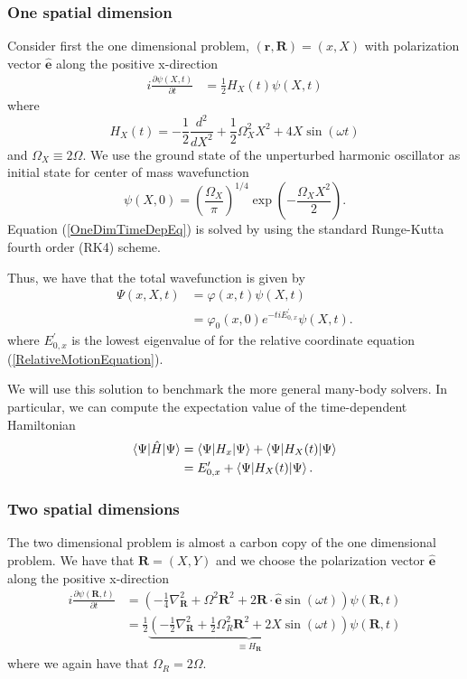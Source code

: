\documentclass[aip,jcp,reprint,floatfix]{revtex4-1}
\begin{document}
\begin{appendices}
\subsubsection{One spatial dimension}
Consider first the one dimensional problem, $(\mathbf{r},\mathbf{R}) = (x,X)$ with polarization vector $\hat{\mathbf{e}}$ along the positive x-direction 
\begin{align}
    i \frac{\partial \psi(X,t)}{\partial t} &= \frac{1}{2} H_X(t) \psi(X,t) \label{OneDimTimeDepEq}
\end{align}
where 
\begin{equation}
    H_X(t) =  -\frac{1}{2}\frac{d^2}{dX^2} + \frac{1}{2}\Omega_X^2 X^2 + 4X \sin(\omega t) 
\end{equation}
and $\Omega_X \equiv 2\Omega$. We use the ground state of the unperturbed harmonic oscillator as initial state for center of mass wavefunction 
\begin{equation}
    \psi(X,0) = \left( \frac{\Omega_X}{\pi} \right)^{1/4} \exp\left(-\frac{\Omega_X X^2}{2}\right).
\end{equation}
Equation (\ref{OneDimTimeDepEq}) is solved by using the standard Runge-Kutta fourth order (RK4) scheme.

Thus, we have that the total wavefunction is given by 
\begin{align}
 \Psi(x,X,t) &= \varphi(x,t) \psi(X,t) \nonumber \\
 &= \varphi_0(x,0)e^{-tiE_{0,x}^\prime} \psi(X,t).
\end{align}
where $E_{0,x}^\prime$ is the lowest eigenvalue of for the relative coordinate equation (\ref{RelativeMotionEquation}).

We will use this solution to benchmark the more general many-body solvers. In particular, we can compute the expectation value 
of the time-dependent Hamiltonian
\begin{align}
 \braket{\Psi|\hat{H}|\Psi} &= \braket{\Psi|H_x|\Psi} + \braket{\Psi|H_X(t)|\Psi} \nonumber \\
 &= E_{0,x}^\prime + \braket{\Psi|H_X(t)|\Psi}.
\end{align}

\subsubsection{Two spatial dimensions}
The two dimensional problem is almost a carbon copy of the one dimensional problem. We have that $\mathbf{R} = (X,Y)$ and we choose the polarization vector $\hat{\mathbf{e}}$ along the positive x-direction
\begin{align*}
    i \frac{\partial \psi(\mathbf{R},t)}{\partial t} &= \left( -\frac{1}{4}\nabla_\mathbf{R}^2 + \Omega^2 \mathbf{R}^2 + 2\mathbf{R} \cdot \hat{\mathbf{e}} \sin(\omega t) \right) \psi(\mathbf{R},t) \\
    &= \frac{1}{2}\underbrace{\left( -\frac{1}{2}\nabla_\mathbf{R}^2 + \frac{1}{2}\Omega_R^2 \mathbf{R}^2 + 2X \sin(\omega t) \right)}_{\equiv H_\mathbf{R}} \psi(\mathbf{R},t)
\end{align*}
where we again have that $\Omega_R = 2\Omega$.


\end{appendices}
\end{document}
